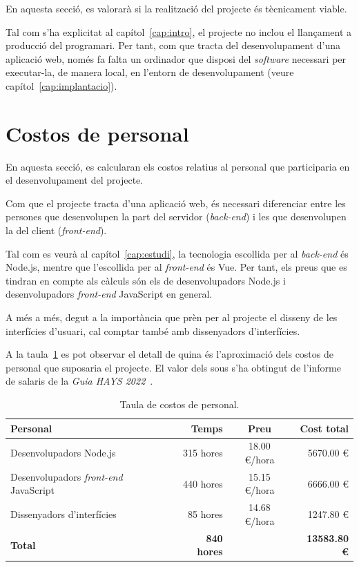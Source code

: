 \documentclass[a4paper,12pt]{ThesisStyle}
\begin{document}
En aquesta secció, es valorarà si la realització del projecte és tècnicament viable.

Tal com s'ha explicitat al capítol~\ref{cap:intro}, el projecte no inclou el llançament a producció del programari. Per tant, com que tracta del desenvolupament d'una aplicació web, només fa falta un ordinador que disposi del \textit{software} necessari per executar-la, de manera local, en l'entorn de desenvolupament (veure capítol~\ref{cap:implantacio}).

\section{Costos de personal}
\label{sec:costos_personal}

En aquesta secció, es calcularan els costos relatius al personal que participaria en el desenvolupament del projecte.

Com que el projecte tracta d'una aplicació web, és necessari diferenciar entre les persones que desenvolupen la part del servidor (\textit{back-end}) i les que desenvolupen la del client (\textit{front-end}).

Tal com es veurà al capítol~\ref{cap:estudi}, la tecnologia escollida per al \textit{back-end} és Node.js, mentre que l'escollida per al \textit{front-end} és Vue. Per tant, els preus que es tindran en compte als càlculs són els de desenvolupadors Node.js i desenvolupadors \textit{front-end} JavaScript en general.

A més a més, degut a la importància que prèn per al projecte el disseny de les interfícies d'usuari, cal comptar també amb dissenyadors d'interfícies.

A la taula~\ref{taula:costos_personal} es pot observar el detall de quina és l'aproximació dels costos de personal que suposaria el projecte. El valor dels sous s'ha obtingut de l'informe de salaris de la \emph{Guia HAYS 2022}~\cite{Hays}.

\begin{table}[H]
  \begin{tabularx}{\textwidth}{X  r  c  r}
    \toprule
    \rowcolor{TblDef}
    \textbf{Personal}                               & \textbf{Temps}      & \textbf{Preu}   & \textbf{Cost total} \\
    \midrule[0.9pt]
    Desenvolupadors Node.js                         & 315 hores           & 18.00 €/hora    & 5670.00 € \\
    \midrule
    Desenvolupadors \textit{front-end} JavaScript   & 440 hores           & 15.15 €/hora    & 6666.00 € \\
    \midrule
    Dissenyadors d'interfícies                      & 85 hores            & 14.68 €/hora    & 1247.80 € \\
    \midrule[0.9pt]
    \textbf{Total}                                  & \textbf{840 hores}  &                 & \textbf{13583.80 €} \\
    \bottomrule
  \end{tabularx}
  \caption{\label{taula:costos_personal} Taula de costos de personal.}
\end{table}
\end{document}
